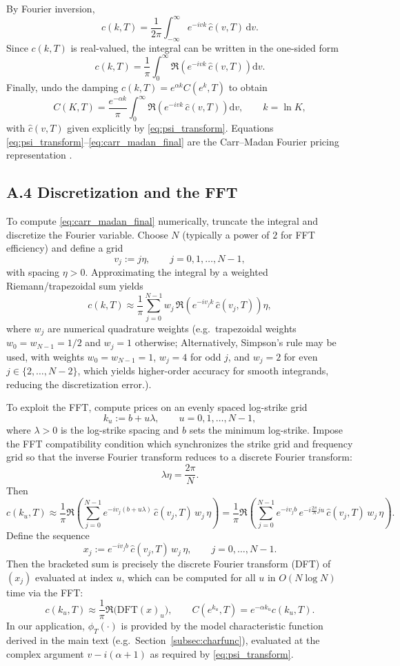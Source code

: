 \documentclass[a4paper,titlepage,12pt]{report}
\theoremstyle{plain}
\begin{document}
\noindent
By Fourier inversion,
\[
c(k,T)
=
\frac{1}{2\pi}\int_{-\infty}^{\infty} e^{-ivk}\,\widehat{c}(v,T)\,\mathrm{d}v.
\]
Since $c(k,T)$ is real-valued, the integral can be written in the one-sided form
\[
c(k,T)
=
\frac{1}{\pi}\int_{0}^{\infty} \Re\!\left(e^{-ivk}\,\widehat{c}(v,T)\right)\mathrm{d}v.
\]
Finally, undo the damping $c(k,T)=e^{\alpha k}C(e^k,T)$ to obtain
\begin{equation}
C(K,T)
=
\frac{e^{-\alpha k}}{\pi}\int_{0}^{\infty}
\Re\!\left(e^{-ivk}\,\widehat{c}(v,T)\right)\mathrm{d}v,
\qquad k=\ln K,
\label{eq:carr_madan_final}
\end{equation}
with $\widehat{c}(v,T)$ given explicitly by \eqref{eq:psi_transform}.
Equations \eqref{eq:psi_transform}--\eqref{eq:carr_madan_final} are the Carr--Madan Fourier pricing
representation \citep{CarrMadan1999}.

\subsection*{A.4 Discretization and the FFT}

\noindent
To compute \eqref{eq:carr_madan_final} numerically, truncate the integral and discretize the
Fourier variable. Choose $N$ (typically a power of $2$ for FFT efficiency) and define a grid
\[
v_j := j\eta,\qquad j=0,1,\dots,N-1,
\]
with spacing $\eta>0$. Approximating the integral by a weighted Riemann/trapezoidal sum yields
\[
c(k,T)\approx
\frac{1}{\pi}\sum_{j=0}^{N-1} w_j\,
\Re\!\left(e^{-iv_j k}\,\widehat{c}(v_j,T)\right)\eta,
\]
where $w_j$ are numerical quadrature weights (e.g.\ trapezoidal weights $w_0=w_{N-1}=1/2$ and
$w_j=1$ otherwise; Alternatively, Simpson’s rule may be used, with weights $w_0=w_{N-1}=1$, $w_j=4$ for odd $j$, and $w_j=2$ for even $j\in\{2,\dots,N-2\}$, which yields higher-order accuracy for smooth integrands, reducing the discretization error.).

To exploit the FFT, compute prices on an evenly spaced log-strike grid
\[
k_u := b + u\lambda,\qquad u=0,1,\dots,N-1,
\]
where $\lambda>0$ is the log-strike spacing and $b$ sets the minimum log-strike. Impose the FFT
compatibility condition which synchronizes the strike grid and frequency grid so that the inverse Fourier transform reduces to a discrete Fourier transform:
\[
\lambda\eta=\frac{2\pi}{N}.
\]
Then
\[
c(k_u,T)\approx
\frac{1}{\pi}\Re\!\left(
\sum_{j=0}^{N-1} e^{-iv_j(b+u\lambda)}\,\widehat{c}(v_j,T)\,w_j\,\eta
\right)
=
\frac{1}{\pi}\Re\!\left(
\sum_{j=0}^{N-1} e^{-iv_j b}\,e^{-i\frac{2\pi}{N}ju}\,
\widehat{c}(v_j,T)\,w_j\,\eta
\right).
\]
Define the sequence
\[
x_j := e^{-iv_j b}\,\widehat{c}(v_j,T)\,w_j\,\eta,\qquad j=0,\dots,N-1.
\]
Then the bracketed sum is precisely the discrete Fourier transform (DFT) of $(x_j)$ evaluated at
index $u$, which can be computed for all $u$ in $O(N\log N)$ time via the FFT:
\[
c(k_u,T)\approx \frac{1}{\pi}\Re\!\big(\mathrm{DFT}(x)_u\big),
\qquad
C(e^{k_u},T)=e^{-\alpha k_u}c(k_u,T).
\]
In our application, $\phi_T(\cdot)$ is provided by the model characteristic function derived in the
main text (e.g.\ Section~\ref{subsec:charfunc}), evaluated at the complex argument
$v-i(\alpha+1)$ as required by \eqref{eq:psi_transform}.
\end{document}
